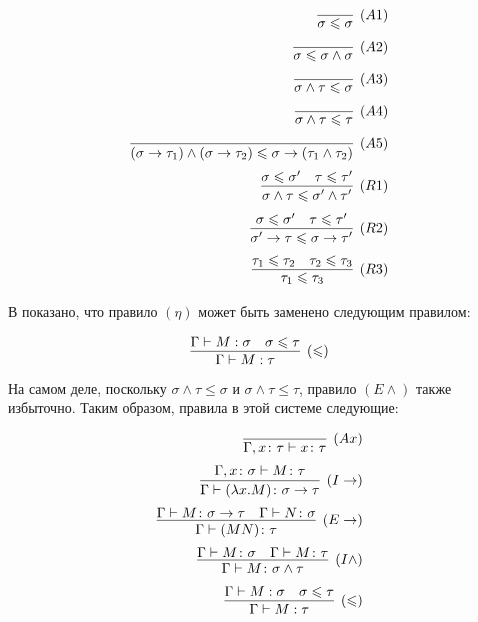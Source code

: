 \documentclass[../main.tex]{subfiles}
\begin{document}
\begin{equation} \label{rules leq}
\begin{aligned}
\infer[(A1)]{\sigma \leqslant \sigma}{} \\[2pt]
\infer[(A2)]{\sigma \leqslant \sigma \wedge \sigma}{} \\[2pt]
\infer[(A3)]{\sigma \wedge \tau \leqslant \sigma}{} \\[2pt]
\infer[(A4)]{\sigma \wedge \tau \leqslant \tau}{} \\[2pt]
\infer[(A5)]{(\sigma \to \tau_1) \wedge (\sigma \to \tau_2) \leqslant \sigma \to (\tau_1 \wedge \tau_2)}{} \\[2pt]
\infer[(R1)]{\sigma \wedge \tau \leqslant \sigma' \wedge \tau'}{\sigma \leqslant \sigma' & \tau \leqslant \tau'} \\[2pt]
\infer[(R2)]{\sigma' \to \tau \leqslant \sigma \to \tau'}{\sigma \leqslant \sigma' & \tau \leqslant \tau'} \\[2pt]
\infer[(R3)]{\tau_1 \leqslant \tau_3}{\tau_1 \leqslant \tau_2 & \tau_2 \leqslant \tau_3} 
\end{aligned}
\end{equation}


В \cite{hindley_92} показано, что правило $(\eta)$ может быть заменено следующим правилом:

$$\infer[(\leqslant)]{\Gamma \vdash M : \tau}{\Gamma \vdash M : \sigma & \sigma \leqslant \tau}$$

На самом деле, поскольку $\sigma \wedge \tau \leqslant \sigma$ и $\sigma \wedge \tau \leqslant \tau$, правило $(E \wedge)$ также избыточно. Таким образом, правила в этой системе следующие: 

\begin{equation} \label{rules subtype}
\begin{aligned}
\infer[(Ax)]{\Gamma, x \colon \tau \vdash x \colon \tau}{}\\[2pt]
\infer[(I\to)]{\Gamma \vdash (\lambda x . M) \colon \sigma \to \tau}{\Gamma, x \colon \sigma \vdash M \colon \tau}\\[2pt]
\infer[(E\to)]{\Gamma \vdash (MN) \colon \tau}{\Gamma \vdash M \colon \sigma \to \tau & \Gamma \vdash N \colon \sigma}\\[2pt]
\infer[(I\wedge)]{\Gamma \vdash M \colon \sigma \wedge \tau}{\Gamma \vdash M \colon \sigma & \Gamma \vdash M \colon \tau}\\[2pt]
\infer[(\leqslant)]{\Gamma \vdash M : \tau}{\Gamma \vdash M : \sigma & \sigma \leqslant \tau}

\end{aligned}
\end{equation}
\end{document}
